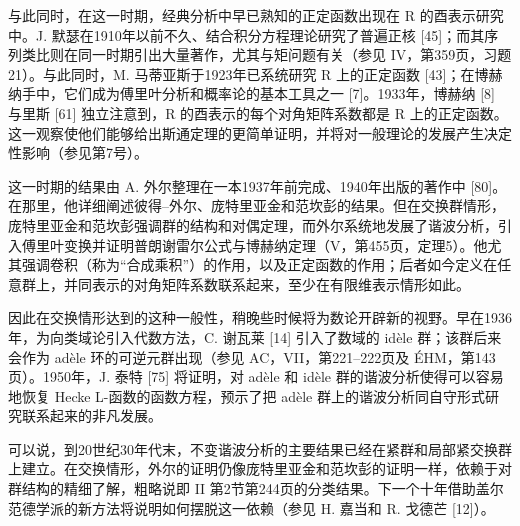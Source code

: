 与此同时，在这一时期，经典分析中早已熟知的正定函数出现在 R 的酉表示研究中。J. 默瑟在1910年以前不久、结合积分方程理论研究了普遍正核 {[}45{]}；而其序列类比则在同一时期引出大量著作，尤其与矩问题有关（参见 IV，第359页，习题21）。与此同时，M. 马蒂亚斯于1923年已系统研究 R 上的正定函数 {[}43{]}；在博赫纳手中，它们成为傅里叶分析和概率论的基本工具之一 {[}7{]}。1933年，博赫纳 {[}8{]} 与里斯 {[}61{]} 独立注意到，R 的酉表示的每个对角矩阵系数都是 R 上的正定函数。这一观察使他们能够给出斯通定理的更简单证明，并将对一般理论的发展产生决定性影响（参见第7号）。

这一时期的结果由 A. 外尔整理在一本1937年前完成、1940年出版的著作中 {[}80{]}。在那里，他详细阐述彼得--外尔、庞特里亚金和范坎彭的结果。但在交换群情形，庞特里亚金和范坎彭强调群的结构和对偶定理，而外尔系统地发展了谐波分析，引入傅里叶变换并证明普朗谢雷尔公式与博赫纳定理（V，第455页，定理5）。他尤其强调卷积（称为“合成乘积”）的作用，以及正定函数的作用；后者如今定义在任意群上，并同表示的对角矩阵系数联系起来，至少在有限维表示情形如此。

因此在交换情形达到的这种一般性，稍晚些时候将为数论开辟新的视野。早在1936年，为向类域论引入代数方法，C. 谢瓦莱 {[}14{]} 引入了数域的 idèle 群；该群后来会作为 adèle 环的可逆元群出现（参见 AC，VII，第221--222页及 ÉHM，第143页）。1950年，J. 泰特 {[}75{]} 将证明，对 adèle 和 idèle 群的谐波分析使得可以容易地恢复 Hecke L-函数的函数方程，预示了把 adèle 群上的谐波分析同自守形式研究联系起来的非凡发展。

可以说，到20世纪30年代末，不变谐波分析的主要结果已经在紧群和局部紧交换群上建立。在交换情形，外尔的证明仍像庞特里亚金和范坎彭的证明一样，依赖于对群结构的精细了解，粗略说即 II 第2节第244页的分类结果。下一个十年借助盖尔范德学派的新方法将说明如何摆脱这一依赖（参见 H. 嘉当和 R. 戈德芒 {[}12{]}）。

